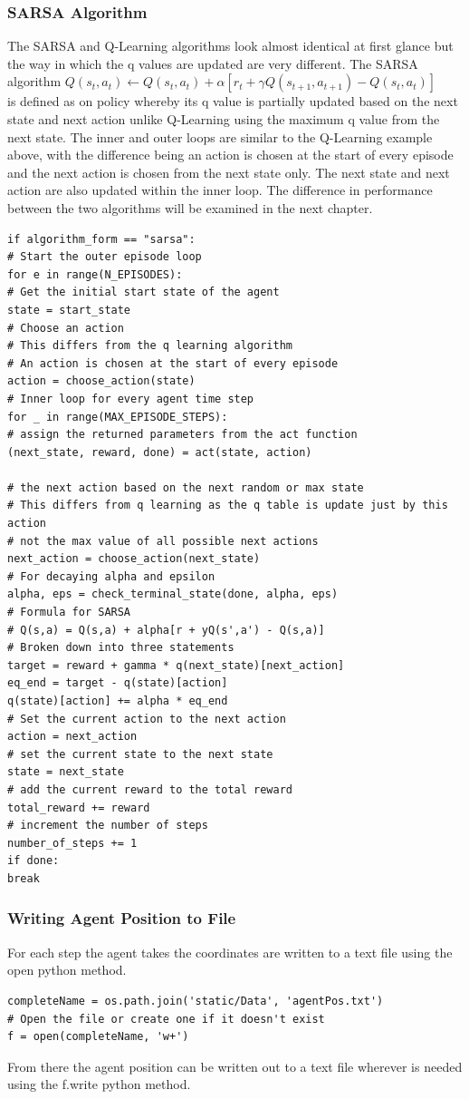 \subsubsection{SARSA Algorithm}
The SARSA and Q-Learning algorithms look almost identical at first glance but the way in which the q values are updated are very different. The SARSA algorithm $Q(s_{t},a_{t})\leftarrow Q(s_{t},a_{t})+\alpha [r_{t}+\gamma Q(s_{t+1},a_{t+1})-Q(s_{t},a_{t})]$~\cite{Stateac29:online}\\ is defined as on policy whereby its q value is partially updated based on the next state and next action unlike Q-Learning using the maximum q value from the next state. The inner and outer loops are similar to the Q-Learning example above, with the difference being an action is chosen at the start of every episode and the next action is chosen from the next state only. The next state and next action are also updated within the inner loop. The difference in performance between the two algorithms will be examined in the next chapter.
\begin{verbatim}
if algorithm_form == "sarsa":
# Start the outer episode loop
for e in range(N_EPISODES):
# Get the initial start state of the agent
state = start_state
# Choose an action
# This differs from the q learning algorithm
# An action is chosen at the start of every episode
action = choose_action(state)
# Inner loop for every agent time step
for _ in range(MAX_EPISODE_STEPS):
# assign the returned parameters from the act function
(next_state, reward, done) = act(state, action)

# the next action based on the next random or max state
# This differs from q learning as the q table is update just by this action
# not the max value of all possible next actions
next_action = choose_action(next_state)
# For decaying alpha and epsilon
alpha, eps = check_terminal_state(done, alpha, eps)
# Formula for SARSA
# Q(s,a) = Q(s,a) + alpha[r + yQ(s',a') - Q(s,a)]
# Broken down into three statements
target = reward + gamma * q(next_state)[next_action]
eq_end = target - q(state)[action]
q(state)[action] += alpha * eq_end
# Set the current action to the next action
action = next_action
# set the current state to the next state
state = next_state
# add the current reward to the total reward
total_reward += reward
# increment the number of steps
number_of_steps += 1
if done:
break

\end{verbatim}
\subsubsection{Writing Agent Position to File}
For each step the agent takes the coordinates are written to a text file using the open python method.
\begin{verbatim}
completeName = os.path.join('static/Data', 'agentPos.txt')
# Open the file or create one if it doesn't exist
f = open(completeName, 'w+')
\end{verbatim}
From there the agent position can be written out to a text file wherever is needed using the f.write python method.

